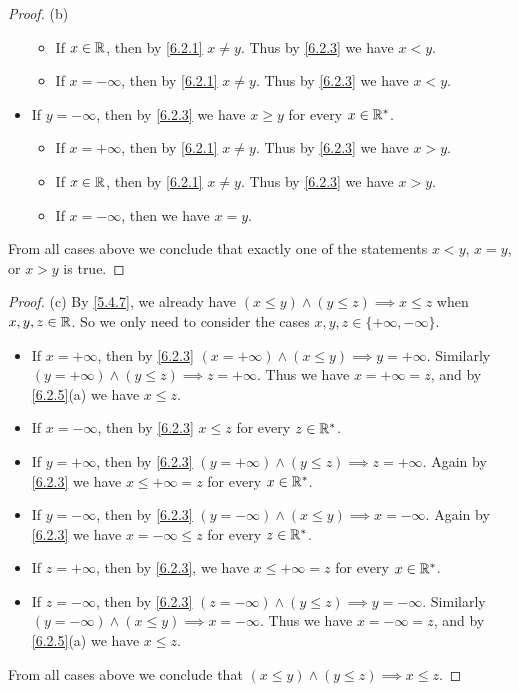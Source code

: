 \begin{proof}{(b)}
\begin{itemize}
\begin{itemize}
            \item If \(x \in \mathbb{R}\), then by \cref{6.2.1} \(x \neq y\).
                  Thus by \cref{6.2.3} we have \(x < y\).
            \item If \(x = -\infty\), then by \cref{6.2.1} \(x \neq y\).
                  Thus by \cref{6.2.3} we have \(x < y\).
          \end{itemize}
    \item If \(y = -\infty\), then by \cref{6.2.3} we have \(x \geq y\) for every \(x \in \mathbb{R}^*\).
          \begin{itemize}
            \item If \(x = +\infty\), then by \cref{6.2.1} \(x \neq y\).
                  Thus by \cref{6.2.3} we have \(x > y\).
            \item If \(x \in \mathbb{R}\), then by \cref{6.2.1} \(x \neq y\).
                  Thus by \cref{6.2.3} we have \(x > y\).
            \item If \(x = -\infty\), then we have \(x = y\).
          \end{itemize}
  \end{itemize}
  From all cases above we conclude that exactly one of the statements \(x < y\), \(x = y\), or \(x > y\) is true.
\end{proof}

\begin{proof}{(c)}
  By \cref{5.4.7}, we already have \((x \leq y) \land (y \leq z) \implies x \leq z\) when \(x, y, z \in \mathbb{R}\).
  So we only need to consider the cases \(x, y, z \in \{+\infty, -\infty\}\).
  \begin{itemize}
    \item If \(x = +\infty\), then by \cref{6.2.3} \((x = +\infty) \land (x \leq y) \implies y = +\infty\).
          Similarly \((y = +\infty) \land (y \leq z) \implies z = +\infty\).
          Thus we have \(x = +\infty = z\), and by \cref{6.2.5}(a) we have \(x \leq z\).
    \item If \(x = -\infty\), then by \cref{6.2.3} \(x \leq z \) for every \(z \in \mathbb{R}^*\).
    \item If \(y = +\infty\), then by \cref{6.2.3} \((y = +\infty) \land (y \leq z) \implies z = +\infty\).
          Again by \cref{6.2.3} we have \(x \leq +\infty = z\) for every \(x \in \mathbb{R}^*\).
    \item If \(y = -\infty\), then by \cref{6.2.3} \((y = -\infty) \land (x \leq y) \implies x = -\infty\).
          Again by \cref{6.2.3} we have \(x = -\infty \leq z\) for every \(z \in \mathbb{R}^*\).
    \item If \(z = +\infty\), then by \cref{6.2.3}, we have \(x \leq +\infty = z\) for every \(x \in \mathbb{R}^*\).
    \item If \(z = -\infty\), then by \cref{6.2.3} \((z = -\infty) \land (y \leq z) \implies y = -\infty\).
          Similarly \((y = -\infty) \land (x \leq y) \implies x = -\infty\).
          Thus we have \(x = -\infty = z\), and by \cref{6.2.5}(a) we have \(x \leq z\).
  \end{itemize}
  From all cases above we conclude that \((x \leq y) \land (y \leq z) \implies x \leq z\).
\end{proof}

